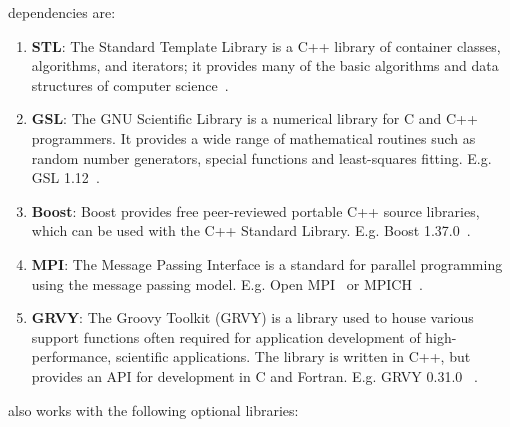 \Queso{} dependencies are:
\begin{enumerate}%

  \item \textbf{STL}: The Standard Template Library is a C++ library of container classes, algorithms, and iterators; it provides many of the basic algorithms and data structures of computer science~\cite{STL}. %

  \item \textbf{GSL}: The GNU Scientific Library is a numerical library for C and C++ programmers. It provides a wide range of mathematical routines such as random number generators, special functions and least-squares fitting. E.g. GSL 1.12~\cite{Gsl}. %

  \item \textbf{Boost}: Boost provides free peer-reviewed portable C++ source libraries, which can be used with the C++ Standard Library. E.g. Boost 1.37.0~\cite{Boost}.

  \item \textbf{MPI}: The Message Passing Interface is a standard for parallel programming using the message passing model. E.g. Open MPI~\cite{Openmpi} or MPICH~\cite{Mpich}. 

  \item \textbf{GRVY}: The Groovy Toolkit (GRVY) is a library used to house various support functions often required for application development of high-performance, scientific applications. The library is written in C++, but provides an API for development in C and Fortran. E.g. GRVY 0.31.0 ~\cite{grvy}.

\end{enumerate}%

\Queso{} also works with the following optional libraries:

